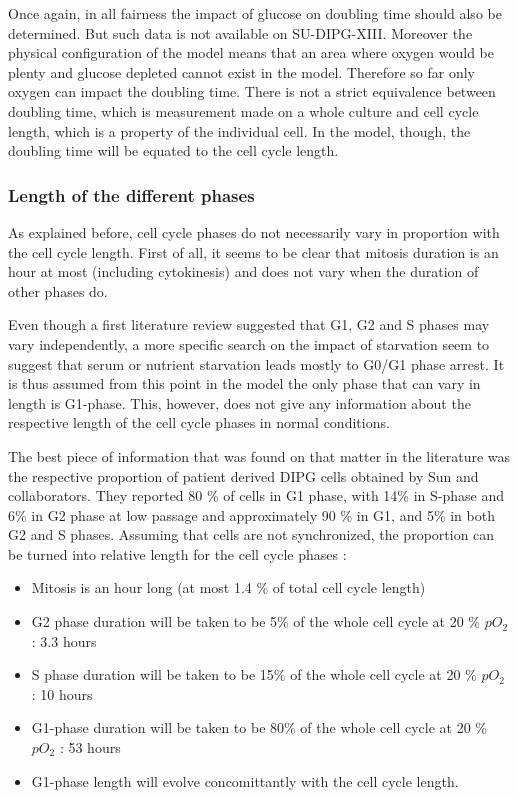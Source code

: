 \documentclass[11pt,a4paper]{article}
\begin{document}
Once again, in all fairness the impact of glucose on doubling time should also be determined. But such data is not available on SU-DIPG-XIII. Moreover the physical configuration of the model means that an area where oxygen would be plenty and glucose depleted cannot exist in the model. Therefore so far only oxygen can impact the doubling time. There is not a strict equivalence between doubling time, which is measurement made on a whole culture and cell cycle length, which is a property of the individual cell. In the model, though, the doubling time will be equated to the cell cycle length.

\subsubsection{Length of the different phases}
As explained before, cell cycle phases do not necessarily vary in proportion with the cell cycle length. First of all, it seems to be clear that mitosis duration is an hour at most (including cytokinesis)\cite{Cooper2006}\cite{Araujo2016}\cite{Chao2019} and does not vary when the duration of other phases do.

Even though a first literature review suggested that G1, G2 and S phases may vary independently\cite{Chao2019}\cite{Fisher2022}, a more specific search on the impact of starvation seem to suggest that serum or nutrient starvation leads mostly to G0/G1 phase arrest.\cite{Wang2021}\cite{Chen2012}\cite{Hahn2009} It is thus assumed from this point in the model the only phase that can vary in length is G1-phase. This, however, does not give any information about the respective length of the cell cycle phases in normal conditions.

The best piece of information that was found on that matter in the literature was the respective proportion of patient derived DIPG cells obtained by Sun and collaborators. They reported 80 \% of cells in G1 phase, with 14\% in S-phase and 6\% in G2 phase at low passage and approximately 90 \% in G1, and 5\% in both G2 and S phases.\cite{Sun2019} Assuming that cells are not synchronized, the proportion can be turned into relative length for the cell cycle phases : 
\begin{itemize}
\item Mitosis is an hour long (at most 1.4 \% of total cell cycle length)
\item G2 phase duration will be taken to be 5\% of the whole cell cycle at 20 \% $pO_2$ : 3.3 hours
\item S phase duration will be taken to be 15\% of the whole cell cycle at 20 \% $pO_2$ : 10 hours
\item G1-phase duration will be taken to be 80\% of the whole cell cycle at 20 \% $pO_2$ : 53 hours
\item G1-phase length will evolve concomittantly with the cell cycle length.
\end{itemize}
\end{document}
